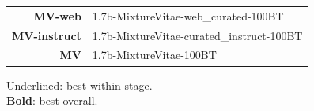 \documentclass{article}
\begin{document}
\begin{table}[htbp]
{\begin{tabular}{cl | ccc | ccc | ccc}
\bottomrule
\end{tabular}
}
\vspace{0.5em}
\noindent
\begin{minipage}[t]{0.6\textwidth}
\raggedright
\small
\begin{tabular}{r@{: }l}
\textbf{MV-web} & 1.7b-MixtureVitae-web_curated-100BT \\
\textbf{MV-instruct} & 1.7b-MixtureVitae-curated_instruct-100BT \\
\textbf{MV} & 1.7b-MixtureVitae-100BT \\
\end{tabular}
\end{minipage}%
\hfill
\begin{minipage}[t]{0.35\textwidth}
\raggedleft
\footnotesize{
\underline{Underlined}: best within stage.\\
\textbf{Bold}: best overall.
}
\end{minipage}
\end{table}
\end{document}
